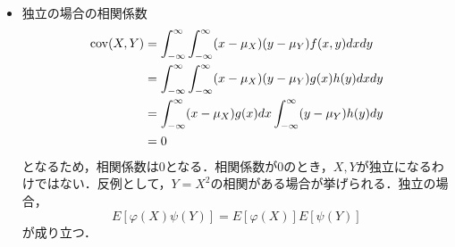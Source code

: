\documentclass[autodetect-engine,dvipdfmx-if-dvi,ja=standard,a4paper,11pt]{bxjsarticle} %
\begin{document}
\begin{itemize}
\item 独立の場合の相関係数\\
\begin{equation}
\begin{split}
{\rm cov}(X,Y)&=\displaystyle\int_{-\infty}^{\infty}\int_{-\infty}^{\infty}(x-\mu_X)(y-\mu_Y)f(x,y)dxdy\\
&=\displaystyle\int_{-\infty}^{\infty}\int_{-\infty}^{\infty}(x-\mu_X)(y-\mu_Y)g(x)h(y)dxdy\\
&=\displaystyle\int_{-\infty}^{\infty}(x-\mu_X)g(x)dx\int_{-\infty}^{\infty}(y-\mu_Y)h(y)dy\\
&=0
\end{split}
\end{equation}
となるため，相関係数は0となる．相関係数が0のとき，$X,Y$が独立になるわけではない．反例として，$Y=X^2$の相関がある場合が挙げられる．独立の場合，
\begin{equation}
E[\varphi(X)\psi(Y)]=E[\varphi(X)]E[\psi(Y)]
\end{equation}
が成り立つ．
\end{itemize}
\end{document}
